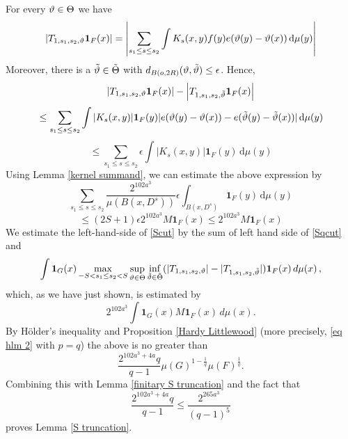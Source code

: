 For every $\vartheta\in \Theta$ we have
\begin{equation}
\left| T_{1, s_1,s_2,\vartheta} \mathbf{1}_{F}(x)\right|=
\left|\sum_{s_1 \le s\le s_2}
\int K_s(x,y)  f(y) e(\vartheta(y)-{\vartheta(x)}) \, \mathrm{d}\mu(y)\right|
\end{equation}
Moreover, there is a $\tilde{\vartheta}
\in \tilde{\Theta}$ with $d_{B(o,2R)}(\vartheta,\tilde{\vartheta})\le \epsilon$. Hence,
$$
    \left| T_{1, s_1,s_2,\vartheta} \mathbf{1}_{F}(x)\right|-\left|T_{1, s_1,s_2,\tilde{\vartheta}} \mathbf{1}_{F}(x) \right|
$$
$$
  \leq\sum_{s_1 \le s\le s_2} \int |K_s(x,y)|  \mathbf{1}_F(y) |e(\vartheta(y)-{\vartheta(x)})-e({\tilde{\vartheta}(y)}-{\tilde{\vartheta}(x)})| \, \mathrm{d}\mu(y)
$$
$$
    \leq \sum_{s_1 \le s\le s_2} \epsilon \int |K_s(x,y)|  \mathbf{1}_F(y) \, \mathrm{d}\mu(y)
$$
Using Lemma \ref{kernel summand}, we can estimate the above expression by
$$
    \sum_{s_1 \le s\le s_2} \frac{2^{102 a^3}}{\mu(B(x, D^{s}))}
\epsilon \int_{B(x, D^s)} \mathbf{1}_F(y)  \, \mathrm{d}\mu(y)
$$
$$
    \leq (2S+1)\epsilon 2^{102 a^3} M\mathbf{1}_F(x)\le 2^{102 a^3}M\mathbf{1}_F(x)
$$
We estimate the left-hand-side of \eqref{Scut} by
the sum of left hand side of \eqref{Sqcut} and
  \begin{equation}
    \int \mathbf{1}_{G}(x)
\max_{-S<s_1\le s_2<S}\sup_{\vartheta\in {\Theta}}
\inf_{\tilde{\vartheta}\in\tilde{\Theta}}
(| T_{1, s_1,s_2,\vartheta}|-|T_{1, s_1,s_2,\tilde{\vartheta}}  |)\mathbf{1}_{F}(x)\, d\mu(x)\,,
\end{equation}
which, as we have just shown, is estimated by
\begin{equation}
     2^{102 a^3}\int \mathbf{1}_{G}(x)
M\mathbf{1}_{F}(x)\, d\mu(x).
\end{equation}
By Hölder's inequality and Proposition \ref{Hardy Littlewood}
 (more precisely, \eqref{eq hlm 2} with $p=q$) the above is no greater than
\begin{equation}
\frac{2^{102 a^3+4a}q}{q-1} \mu(G)^{1-\frac{1}{q}} \mu(F)^{\frac{1}{q}}.
\end{equation}
Combining this with Lemma \ref{finitary S truncation} and the fact that
\begin{equation*}
    \frac{2^{102 a^3+4a}q}{q-1}\leq \frac{2^{265a^3}}{(q-1)^5}
\end{equation*}
proves Lemma \ref{S truncation}.

